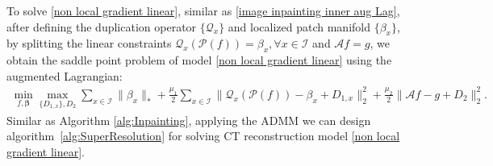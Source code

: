 \documentclass[letterpaper,10pt]{article}
\begin{document}
To solve \eqref{non local gradient linear}, similar as \eqref{image inpainting inner aug Lag}, after defining the duplication operator $\{\mathcal{Q}_x\}$ and localized patch manifold $\{\beta_x\}$, by splitting the linear constraints $\mathcal{Q}_x(\mathcal{P}(f)) = \beta_x, \forall x \in \mathscr{I}$ and $\mathcal{A}f = g$, we obtain  the saddle point problem of model \eqref{non local gradient linear} using the augmented Lagrangian:
\begin{equation}\label{image  Super Resolution inner Empi aug Lag}
\begin{split}
\min_{f,\bm{\beta}}\max_{\{D_{1,x}\},D_2} \sum_{x \in \mathscr{I}} \|{\beta}_x\|_* + \frac{\mu_1}{2} \sum_{x \in \mathscr{I}} \|\mathcal{Q}_x (\mathcal{P} (f)) - {\beta}_x + D_{1,x}\|_2^2 + \frac{\mu_2}{2} \|\mathcal{A} f    -  g +D_2 \|_2^2.
\end{split}
\end{equation}
Similar as Algorithm \ref{alg:Inpainting}, applying the ADMM we can design algorithm~\ref{alg:SuperResolution} for solving CT reconstruction model \eqref{non local gradient linear}.
\end{document}
